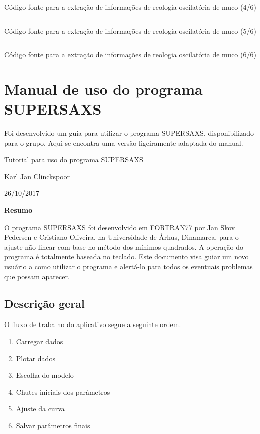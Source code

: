 \begin{apendicesenv}
\begin{listing}[H]
	\inputminted{python}{./python/extracao_muco4.py}
	\caption{Código fonte para a extração de informações de reologia oscilatória de muco (4/6)} 
	\label{lst:extracao_muco4}
\end{listing}

\begin{listing}[H]
	\inputminted{python}{./python/extracao_muco5.py}
	\caption{Código fonte para a extração de informações de reologia oscilatória de muco (5/6)}
	\label{lst:extracao_muco5}
\end{listing}

\begin{listing}[H]
	\inputminted{python}{./python/extracao_muco6.py}
	\caption{Código fonte para a extração de informações de reologia oscilatória de muco (6/6)} 
	\label{lst:extracao_muco6}
\end{listing}


\section{Manual de uso do programa SUPERSAXS}

Foi desenvolvido um guia para utilizar o programa SUPERSAXS, disponibilizado para o grupo. Aqui se encontra uma versão ligeiramente adaptada do manual.

\begin{center}
	\Huge{Tutorial para uso do programa SUPERSAXS}
	
	\Large{Karl Jan Clinckspoor}
	
	\large{26/10/2017}
\end{center}

\textbf{Resumo}

O programa SUPERSAXS foi desenvolvido em FORTRAN77 por Jan Skov Pedersen e Cristiano Oliveira, na Universidade de Århus, Dinamarca, para o ajuste não linear com base no método dos mínimos quadrados. A operação do programa é totalmente baseada no teclado. Este documento visa guiar um novo usuário a como utilizar o programa e alertá-lo para todos os eventuais problemas que possam aparecer.


\subsection*{Descrição geral}

O fluxo de trabalho do aplicativo segue a seguinte ordem.

\begin{enumerate}
	\item Carregar dados
	\item Plotar dados
	\item Escolha do modelo
	\item Chutes iniciais dos parâmetros
	\item Ajuste da curva
	\item Salvar parâmetros finais
\end{enumerate}


\end{apendicesenv}
